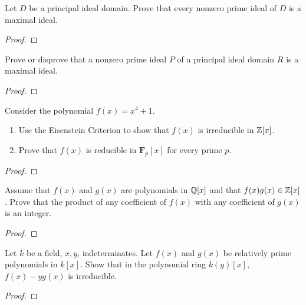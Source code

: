 \begin{problem}
Let $D$ be a principal ideal domain. Prove that every nonzero prime ideal
of $D$ is a maximal ideal.
\end{problem}
\begin{proof}
\end{proof}

\begin{problem}
Prove or disprove that a nonzero prime ideal $P$ of a principal ideal
domain $R$ is a maximal ideal.
\end{problem}
\begin{proof}
\end{proof}

\begin{problem}
Consider the polynomial $f(x)=x^4+1$.
\begin{enumerate}[label=(\alph*)]
\item Use the Eisenstein Criterion to show that $f(x)$ is irreducible in
  $\mathbb{Z}[x]$.
\item Prove that $f(x)$ is reducible in $\mathbf{F}_p[x]$ for every prime
  $p$.
\end{enumerate}
\end{problem}
\begin{proof}
\end{proof}

\begin{problem}
Assume that $f(x)$ and $g(x)$ are polynomials in $\mathbb{Q}[x]$ and that
$f(x)g(x)\in\mathbb{Z}[x]$. Prove that the product of any coefficient of $f(x)$
with any coefficient of $g(x)$ is an integer.
\end{problem}
\begin{proof}
\end{proof}

\begin{problem}
Let $k$ be a field, $x,y$, indeterminates. Let $f(x)$ and $g(x)$ be
relatively prime polynomials in $k[x]$. Show that in the polynomial ring
$k(y)[x]$, $f(x)-yg(x)$ is irreducible.
\end{problem}
\begin{proof}
\end{proof}

